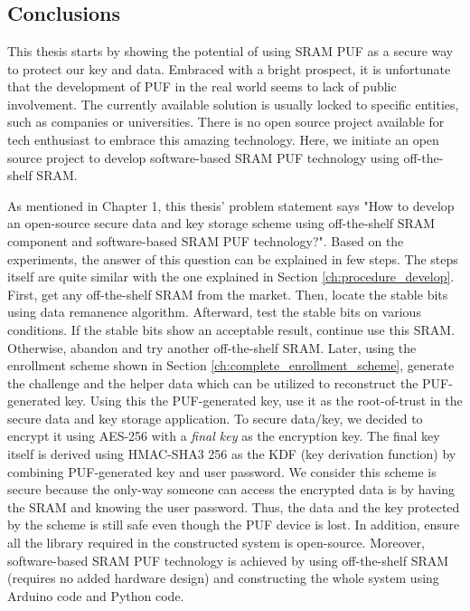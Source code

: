 \chapter{\chapterSix}
\label{chp:6}

\section{Conclusions}
This thesis starts by showing the potential of using SRAM PUF as a secure way to protect our key and data. Embraced with a bright prospect, it is unfortunate that the development of PUF in the real world seems to lack of public involvement. The currently available solution is usually locked to specific entities, such as companies or universities. There is no open source project available for tech enthusiast to embrace this amazing technology. Here, we initiate an open source project to develop software-based SRAM PUF technology using off-the-shelf SRAM.

As mentioned in Chapter 1, this thesis' problem statement says "How to develop an open-source secure data and key storage scheme using off-the-shelf SRAM component and software-based SRAM PUF technology?". Based on the experiments, the answer of this question can be explained in few steps. The steps itself are quite similar with the one explained in Section \ref{ch:procedure_develop}.
First, get any off-the-shelf SRAM from the market. Then, locate the stable bits using data remanence algorithm. Afterward, test the stable bits on various conditions. If the stable bits show an acceptable result, continue use this SRAM. Otherwise, abandon and try another off-the-shelf SRAM. Later, using the enrollment scheme shown in Section \ref{ch:complete_enrollment_scheme},  generate the challenge and the helper data which can be utilized to reconstruct the PUF-generated key. Using this the PUF-generated key, use it as the root-of-trust in the secure data and key storage application. To secure data/key, we decided to encrypt it using AES-256 with a \textit{final key} as the encryption key. The final key itself is derived using HMAC-SHA3 256 as the KDF (key derivation function) by combining PUF-generated key and user password. We consider this scheme is secure because the only-way someone can access the encrypted data is by having the SRAM and knowing the user password. Thus, the data and the key protected by the scheme is still safe even though the PUF device is lost.
In addition, ensure all the library required in the constructed system is open-source.
Moreover, software-based SRAM PUF technology is achieved by using off-the-shelf SRAM (requires no added hardware design) and constructing the whole system using Arduino code and Python code.

